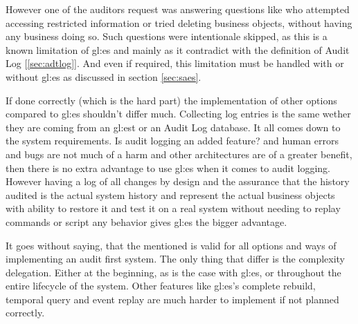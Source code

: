 However one of the auditors request was answering questions like who attempted accessing restricted information or tried deleting business objects, without having any business doing so. Such questions were intentionale skipped, as this is a known limitation of \gls{gl:es} and mainly as it contradict with the definition of Audit Log [\ref{sec:adtlog}]. And even if required, this limitation must be handled with or without \gls{gl:es} as discussed in section \ref{sec:saes}.

If done correctly (which is the hard part) the implementation of other options compared to \gls{gl:es} shouldn't differ much. Collecting log entries is the same wether they are coming from an \gls{gl:est} or an Audit Log database. It all comes down to the system requirements. Is audit logging an added feature? and human errors and bugs are not much of a harm and other architectures are of a greater benefit, then there is no extra advantage to use \gls{gl:es} when it comes to audit logging. However having a log of all changes by design and the assurance that the history audited is the actual system history and represent the actual business objects with ability to restore it and test it on a real system without needing to replay commands or script any behavior gives \gls{gl:es} the bigger advantage. 

It goes without saying, that the mentioned is valid for all options and ways of implementing an audit first system. The only thing that differ is the complexity delegation. Either at the beginning, as is the case with \gls{gl:es}, or throughout the entire lifecycle of the system. Other features like \gls{gl:es}'s complete rebuild, temporal query and event replay are much harder to implement if not planned correctly.